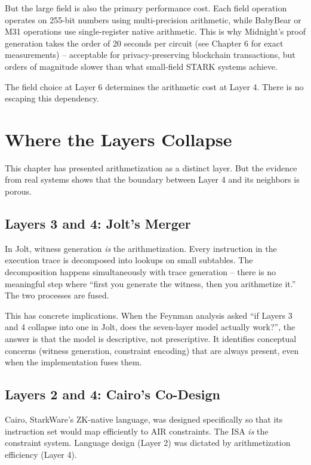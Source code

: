 \documentclass[
  11pt,
  openany]{report}
\begin{document}
But the large field is also the primary performance cost. Each field operation
operates on 255-bit numbers using multi-precision arithmetic, while BabyBear or
M31 operations use single-register native arithmetic. This is why Midnight's
proof generation takes the order of 20 seconds per circuit (see Chapter 6 for
exact measurements) -- acceptable for privacy-preserving blockchain
transactions, but orders of magnitude slower than what small-field STARK systems
achieve.

The field choice at Layer 6 determines the arithmetic cost at Layer 4. There is
no escaping this dependency.

\section{Where the Layers Collapse}\label{where-the-layers-collapse}

This chapter has presented arithmetization as a distinct layer. But the evidence
from real systems shows that the boundary between Layer 4 and its neighbors is
porous.

\subsection{Layers 3 and 4: Jolt's Merger}\label{layers-3-and-4-jolts-merger}

In Jolt, witness generation \emph{is} the arithmetization. Every instruction in
the execution trace is decomposed into lookups on small subtables. The
decomposition happens simultaneously with trace generation -- there is no
meaningful step where ``first you generate the witness, then you arithmetize
it.'' The two processes are fused.

This has concrete implications. When the Feynman analysis asked ``if Layers 3
and 4 collapse into one in Jolt, does the seven-layer model actually work?'',
the answer is that the model is descriptive, not prescriptive. It identifies
conceptual concerns (witness generation, constraint encoding) that are always
present, even when the implementation fuses them.

\subsection{Layers 2 and 4: Cairo's
Co-Design}\label{layers-2-and-4-cairos-co-design}

Cairo, StarkWare's ZK-native language, was designed specifically so that its
instruction set would map efficiently to AIR constraints. The ISA \emph{is} the
constraint system. Language design (Layer 2) was dictated by arithmetization
efficiency (Layer 4).
\end{document}
